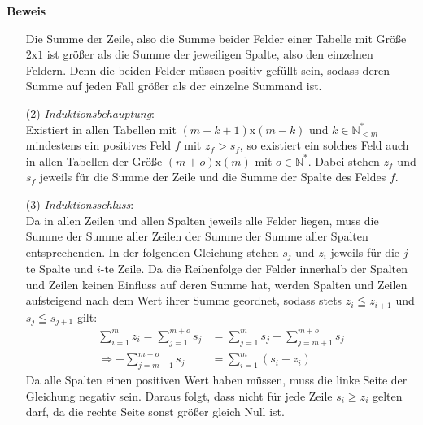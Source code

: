 \documentclass[10pt, a4paper, reqno]{amsart}
\makeatletter
\renewcommand\proofname{Beweis}
\renewenvironment{proof}[1][\proofname]{\par
\pushQED{\qed}%
\normalfont \topsep6\p@\@plus6\p@\relax
\trivlist
\item\relax
{\bfseries#1}\hspace\labelsep\ignorespaces
}{%
\popQED\endtrivlist\@endpefalse
}
\makeatother
\begin{document}
\begin{proof}
\begin{itemize}[itemsep=2ex]
    Die Summe der Zeile, also die Summe beider Felder einer Tabelle mit Größe $2\text{x}1$ ist
    größer als die Summe der jeweiligen Spalte, also den einzelnen Feldern. Denn
    die beiden Felder müssen positiv gefüllt sein, sodass deren Summe auf jeden
    Fall größer als der einzelne Summand ist.
  \item[(2)]\emph{Induktionsbehauptung}:\\
    Existiert in allen Tabellen mit $(m-k+1)\text{x}(m-k)$ und $k∈ℕ^*_{<m}$
    mindestens ein positives Feld $f$ mit $z_f>s_f$, so existiert ein solches Feld auch in
    allen Tabellen der Größe $(m+o)\text{x}(m)$ mit $o∈ℕ^*$. Dabei stehen $z_f$
    und $s_f$ jeweils für die Summe der Zeile und die Summe der Spalte des Feldes $f$.
  \item[(3)]\emph{Induktionsschluss}:\\
    Da in allen Zeilen und allen Spalten jeweils alle Felder liegen, muss die
    Summe der Summe aller Zeilen der Summe der Summe aller Spalten
    entsprechenden. In der folgenden Gleichung stehen $s_j$ und $z_i$ jeweils
    für die $j$-te Spalte und $i$-te Zeile. Da die Reihenfolge der Felder
    innerhalb der Spalten und Zeilen keinen Einfluss auf deren Summe hat, werden
    Spalten und Zeilen aufsteigend nach dem Wert ihrer Summe geordnet, sodass
    stets $z_i\leqq z_{i+1}$ und $s_j\leqq s_{j+1}$ gilt:
    \begin{align*}
      \sum_{i=1}^{m}z_i=\sum_{j=1}^{m+o}s_j&=\sum_{j=1}^{m}s_j+\sum_{j=m+1}^{m+o}s_j\\
      \Rightarrow -\sum_{j=m+1}^{m+o}s_j&= \sum_{i=1}^{m}(s_i-z_i)
    \end{align*}
    Da alle Spalten einen positiven Wert haben müssen, muss die linke Seite der
    Gleichung negativ sein. Daraus folgt, dass nicht für jede Zeile
    $s_i\geq\text{}z_i$ gelten darf, da die rechte Seite sonst größer gleich
    Null ist.
    \begin{figure}[h]
      \centering%
      \def\step{.5cm} \def\col{10} \def\row{8} \def\skip{0.05cm}
      \def\rowskip{\fpeval{\row-3}}
\end{figure}
\end{itemize}
\end{proof}
\end{document}
